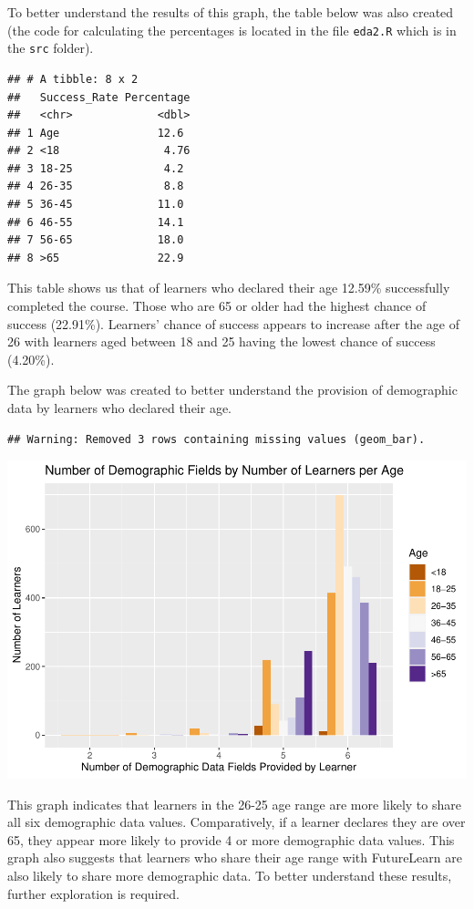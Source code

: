 \documentclass[
]{article}
\begin{document}
To better understand the results of this graph, the table below was also
created (the code for calculating the percentages is located in the file
\texttt{eda2.R} which is in the \texttt{src} folder).

\begin{verbatim}
## # A tibble: 8 x 2
##   Success_Rate Percentage
##   <chr>             <dbl>
## 1 Age               12.6 
## 2 <18                4.76
## 3 18-25              4.2 
## 4 26-35              8.8 
## 5 36-45             11.0 
## 6 46-55             14.1 
## 7 56-65             18.0 
## 8 >65               22.9
\end{verbatim}

This table shows us that of learners who declared their age 12.59\%
successfully completed the course. Those who are 65 or older had the
highest chance of success (22.91\%). Learners' chance of success appears
to increase after the age of 26 with learners aged between 18 and 25
having the lowest chance of success (4.20\%).

The graph below was created to better understand the provision of
demographic data by learners who declared their age.

\begin{verbatim}
## Warning: Removed 3 rows containing missing values (geom_bar).
\end{verbatim}

\includegraphics{CSC8631-Report---210431461_files/figure-latex/age_demographics_declared-1.pdf}

This graph indicates that learners in the 26-25 age range are more
likely to share all six demographic data values. Comparatively, if a
learner declares they are over 65, they appear more likely to provide 4
or more demographic data values. This graph also suggests that learners
who share their age range with FutureLearn are also likely to share more
demographic data. To better understand these results, further
exploration is required.
\end{document}
